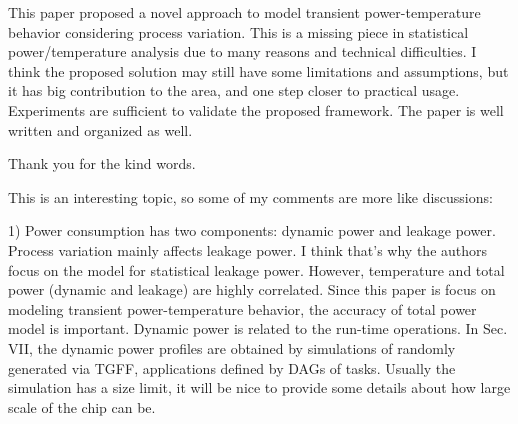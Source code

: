 \begin{reviewer}
This paper proposed a novel approach to model transient power-temperature behavior considering process variation. This is a missing piece in statistical power/temperature analysis due to many reasons and technical difficulties. I think the proposed solution may still have some limitations and assumptions, but it has big contribution to the area, and one step closer to practical usage. Experiments are sufficient to validate the proposed framework. The paper is well written and organized as well.
\end{reviewer}
\begin{authors}
Thank you for the kind words.
\end{authors}

\begin{reviewer}
This is an interesting topic, so some of my comments are more like discussions:

1) Power consumption has two components: dynamic power and leakage power. Process variation mainly affects leakage power. I think that’s why the authors focus on the model for statistical leakage power. However, temperature and total power (dynamic and leakage) are highly correlated. Since this paper is focus on modeling transient power-temperature behavior, the accuracy of total power model is important. Dynamic power is related to the run-time operations. In Sec. VII, the dynamic power profiles are obtained by simulations of randomly generated via TGFF, applications defined by DAGs of tasks. Usually the simulation has a size limit, it will be nice to provide some details about how large scale of the chip can be.
\end{reviewer}
